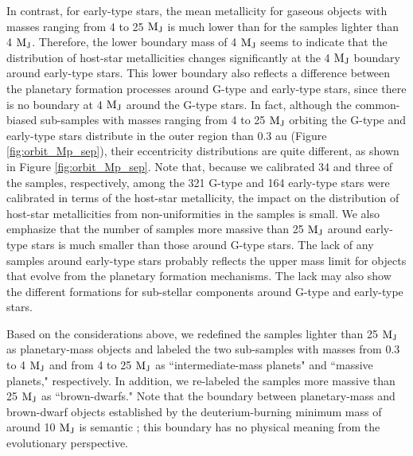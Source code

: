 \documentclass[twocolumn]{aastex62}
\begin{document}
\begin{CJK*}{UTF8}{min}
In contrast, for early-type stars, the mean metallicity for gaseous objects with masses ranging from 4 to 25 $\rm M_J$ is much lower than for the samples lighter than 4 $\rm M_J$. Therefore, the lower boundary mass of 4 $\rm M_J$ seems to indicate that the distribution of host-star metallicities changes significantly at the 4 $\rm M_J$ boundary around early-type stars. This lower boundary also reflects a difference between the planetary formation processes around G-type and early-type stars, since there is no boundary at 4 $\rm M_J$ around the G-type stars. In fact, although the common-biased sub-samples with masses ranging from 4 to 25 $\rm M_J$ orbiting the G-type and early-type stars distribute in the outer region than 0.3 au (Figure \ref{fig:orbit_Mp_sep}), their eccentricity distributions are quite different, as shown in Figure \ref{fig:orbit_Mp_sep}. Note that, because we calibrated 34 and three of the samples, respectively, among the 321 G-type and 164 early-type stars were calibrated in terms of the host-star metallicity, the impact on the distribution of host-star metallicities from non-uniformities in the samples is small. We also emphasize that the number of samples more massive than 25 $\rm M_J$ around early-type stars is much smaller than those around G-type stars. The lack of any samples around early-type stars probably reflects the upper mass limit for objects that evolve from the planetary formation mechanisms. The lack may also show the different formations for sub-stellar components around G-type and early-type stars.

Based on the considerations above, we redefined the samples lighter than 25 $\rm M_J$ as planetary-mass objects and labeled the two sub-samples with masses from 0.3 to 4 $\rm M_J$ and from 4 to 25 $\rm M_J$ as ``intermediate-mass planets" and ``massive planets," respectively. In addition, we re-labeled the samples more massive than 25 $\rm M_J$ as ``brown-dwarfs." Note that the boundary between planetary-mass and brown-dwarf objects established by the deuterium-burning minimum mass of around 10 $\rm M_J$ is semantic \citep{2014prpl.conf..619C}; this boundary has no physical meaning from the evolutionary perspective.


\end{CJK*}
\end{document}
